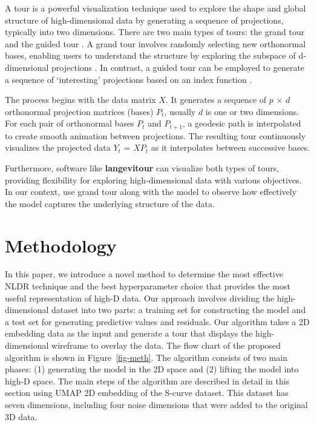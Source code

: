 \documentclass[
  12pt]{article}
\begin{document}
A tour is a powerful visualization technique used to explore the shape
and global structure of high-dimensional data by generating a sequence
of projections, typically into two dimensions. There are two main types
of tours: the grand tour \citep{Asimov1985} and the guided tour
\citep{article29}. A grand tour involves randomly selecting new
orthonormal bases, enabling users to understand the structure by
exploring the subspace of d-dimensional projections \citep{Asimov1985}.
In contrast, a guided tour can be employed to generate a sequence of
`interesting' projections based on an index function \citep{article29}.

The process begins with the data matrix \(X\). It generates a sequence
of \(p\) × \(d\) orthonormal projection matrices (bases) \(P_t\),
usually \(d\) is one or two dimensions. For each pair of orthonormal
bases \(P_t\) and \(P_{t+1}\), a geodesic path is interpolated to create
smooth animation between projections. The resulting tour continuously
visualizes the projected data \(Y_t\) = \(XP_t\) as it interpolates
between successive bases.

Furthermore, software like \textbf{langevitour} can visualize both types
of tours, providing flexibility for exploring high-dimensional data with
various objectives. In our context, use grand tour along with the model
to observe how effectively the model captures the underlying structure
of the data.

\hypertarget{sec-methods}{%
\section{Methodology}\label{sec-methods}}

In this paper, we introduce a novel method to determine the most
effective NLDR technique and the best hyperparameter choice that
provides the most useful representation of high-D data. Our approach
involves dividing the high-dimensional dataset into two parts: a
training set for constructing the model and a test set for generating
predictive values and residuals. Our algorithm takes a 2D embedding data
as the input and generate a tour that displays the high-dimensional
wireframe to overlay the data. The flow chart of the proposed algorithm
is shown in Figure~\ref{fig-meth}. The algorithm consists of two main
phases: (1) generating the model in the 2D space and (2) lifting the
model into high-D space. The main steps of the algorithm are described
in detail in this section using UMAP 2D embedding of the S-curve
dataset. This dataset has seven dimensions, including four noise
dimensions that were added to the original 3D data.
\end{document}
